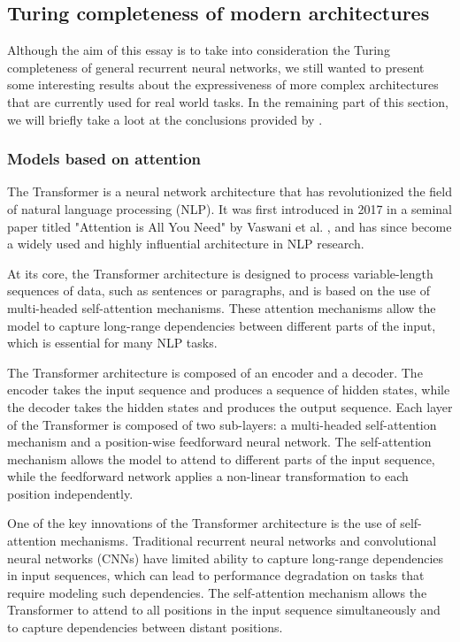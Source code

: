 \documentclass{article}
\begin{document}
\subsection{Turing completeness of modern architectures}

Although the aim of this essay is to take into consideration the Turing completeness of general recurrent neural networks, we still wanted to present some interesting results about the expressiveness of more complex architectures that are currently used for real world tasks. In the remaining part of this section, we will briefly take a loot at the conclusions provided by \cite{PER19}.

\subsubsection{Models based on attention}
The Transformer is a neural network architecture that has revolutionized the field of natural language processing (NLP). It was first introduced in 2017 in a seminal paper titled "Attention is All You Need" by Vaswani et al. \cite{VAS17}, and has since become a widely used and highly influential architecture in NLP research.

At its core, the Transformer architecture is designed to process variable-length sequences of data, such as sentences or paragraphs, and is based on the use of multi-headed self-attention mechanisms. These attention mechanisms allow the model to capture long-range dependencies between different parts of the input, which is essential for many NLP tasks.

The Transformer architecture is composed of an encoder and a decoder. The encoder takes the input sequence and produces a sequence of hidden states, while the decoder takes the hidden states and produces the output sequence. Each layer of the Transformer is composed of two sub-layers: a multi-headed self-attention mechanism and a position-wise feedforward neural network. The self-attention mechanism allows the model to attend to different parts of the input sequence, while the feedforward network applies a non-linear transformation to each position independently.

One of the key innovations of the Transformer architecture is the use of self-attention mechanisms. Traditional recurrent neural networks and convolutional neural networks (CNNs) have limited ability to capture long-range dependencies in input sequences, which can lead to performance degradation on tasks that require modeling such dependencies. The self-attention mechanism allows the Transformer to attend to all positions in the input sequence simultaneously and to capture dependencies between distant positions.
\end{document}
